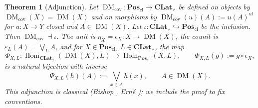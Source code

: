 \documentclass{amsart}
\theoremstyle{plain}
\newtheorem{theorem}{Theorem}[section]
\theoremstyle{definition}
\theoremstyle{remark}
\DeclareMathOperator{\DM}{DM}
\DeclareMathOperator{\Hom}{Hom}
\begin{document}
\begin{theorem}[Adjunction]\label{thm:adjunction}
Let $\DM_{\mathrm{cov}}\colon\mathbf{Pos}_{\mathrm{cl}}\to\mathbf{CLat}_\vee$ be defined on objects by $\DM_{\mathrm{cov}}(X)=\DM(X)$ and on morphisms by $\DM_{\mathrm{cov}}(u)(A):=u(A)^{ul}$ for $u\colon X\to Y$ closed and $A\in\DM(X)$. Let $\iota\colon\mathbf{CLat}_\vee\hookrightarrow\mathbf{Pos}_{\mathrm{cl}}$ be the inclusion. Then $\DM_{\mathrm{cov}}\dashv\iota$. The unit is $\eta_X=\epsilon_X\colon X\to\DM(X)$, the counit is $\varepsilon_L(A)=\bigvee_L A$, and for $X\in\mathbf{Pos}_{\mathrm{cl}}$, $L\in\mathbf{CLat}_\vee$, the map
\[
\Phi_{X,L}\colon\Hom_{\mathbf{CLat}_\vee}(\DM(X),L)\longrightarrow\Hom_{\mathbf{Pos}_{\mathrm{cl}}}(X,L),\qquad \Phi_{X,L}(g):=g\circ\epsilon_X,
\]
is a natural bijection with inverse
\[
\Psi_{X,L}(h)(A):=\bigvee_{x\in A}h(x),\qquad A\in\DM(X).
\]
This adjunction is classical (Bishop \cite{bishop1978universal}, Ern\'e \cite[\S 2]{erne1991dedekind}); we include the proof to fix conventions.
\end{theorem}
\end{document}
